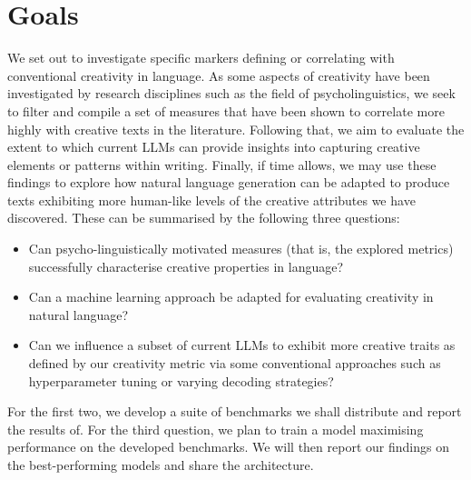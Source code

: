 \documentclass[a4paper,12pt]{article}
\begin{document}

\section*{Goals}
We set out to investigate specific markers defining or correlating with conventional creativity in language. As some aspects of creativity have been investigated by research disciplines such as the field of psycholinguistics, we seek to filter and compile a set of measures that have been shown to correlate more highly with creative texts in the literature. 
Following that, we aim to evaluate the extent to which current LLMs can provide insights into capturing creative elements or patterns within writing. Finally, if time allows, we may use these findings to explore how natural language generation can be adapted to produce texts exhibiting more human-like levels of the creative attributes we have discovered. These can be summarised by the following three questions:

\begin{itemize}
    \item Can psycho-linguistically motivated measures (that is, the explored metrics) successfully characterise creative properties in language?
    \item Can a machine learning approach be adapted for evaluating creativity in natural language?
    \item Can we influence a subset of current LLMs to exhibit more creative traits as defined by our creativity metric via some conventional approaches such as hyperparameter tuning or varying decoding strategies? 
\end{itemize}

For the first two, we develop a suite of benchmarks we shall distribute and report the results of. 
For the third question, we plan to train a model maximising performance on the developed benchmarks. We will then report our findings on the best-performing models and share the architecture.

\end{document}
